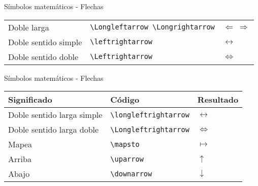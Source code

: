 \documentclass[
  ignorenonframetext,
]{beamer}
\begin{document}
\begin{frame}[fragile]{Símbolos matemáticos - Flechas}
\begin{longtable}[]{@{}lll@{}}
\begin{minipage}[t]{0.30\columnwidth}
Doble larga\strut
\end{minipage} & \begin{minipage}[t]{0.30\columnwidth}\raggedright
\texttt{\textbackslash{}Longleftarrow\ \textbackslash{}Longrightarrow}\strut
\end{minipage} & \begin{minipage}[t]{0.30\columnwidth}\raggedright
\(\Longleftarrow\ \Longrightarrow\)\strut
\end{minipage}\tabularnewline
\begin{minipage}[t]{0.30\columnwidth}\raggedright
Doble sentido simple\strut
\end{minipage} & \begin{minipage}[t]{0.30\columnwidth}\raggedright
\texttt{\textbackslash{}leftrightarrow}\strut
\end{minipage} & \begin{minipage}[t]{0.30\columnwidth}\raggedright
\(\leftrightarrow\)\strut
\end{minipage}\tabularnewline
\begin{minipage}[t]{0.30\columnwidth}\raggedright
Doble sentido doble\strut
\end{minipage} & \begin{minipage}[t]{0.30\columnwidth}\raggedright
\texttt{\textbackslash{}Leftrightarrow}\strut
\end{minipage} & \begin{minipage}[t]{0.30\columnwidth}\raggedright
\(\Leftrightarrow\)\strut
\end{minipage}\tabularnewline
\bottomrule
\end{longtable}

\end{frame}

\begin{frame}[fragile]{Símbolos matemáticos - Flechas}
\protect\hypertarget{suxedmbolos-matemuxe1ticos---flechas-1}{}

\begin{longtable}[]{@{}lll@{}}
\toprule
Significado & Código & Resultado\tabularnewline
\midrule
\endhead
Doble sentido larga simple & \texttt{\textbackslash{}longleftrightarrow}
& \(\longleftrightarrow\)\tabularnewline
Doble sentido larga doble & \texttt{\textbackslash{}Longleftrightarrow}
& \(\Longleftrightarrow\)\tabularnewline
Mapea & \texttt{\textbackslash{}mapsto} & \(\mapsto\)\tabularnewline
Arriba & \texttt{\textbackslash{}uparrow} & \(\uparrow\)\tabularnewline
Abajo & \texttt{\textbackslash{}downarrow} &
\(\downarrow\)\tabularnewline
\bottomrule
\end{longtable}

\end{frame}
\end{document}
